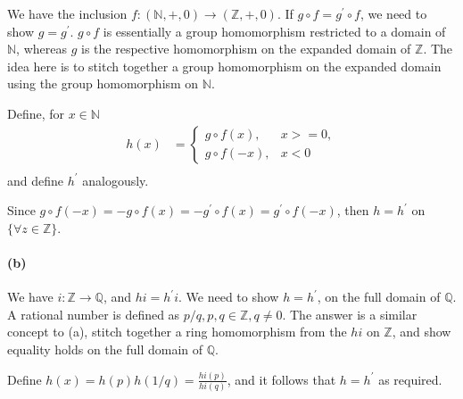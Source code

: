 \documentclass{article}
\begin{document}
We have the inclusion $f: (\mathds{N},+,0) \rightarrow (\mathds{Z},+,0)$. If $g\circ f = g^\prime\circ f$, we need to show $g=g^\prime$. $g\circ f$ is essentially a group homomorphism restricted to a domain of $\mathds{N}$, whereas $g$ is the respective homomorphism on the expanded domain of $\mathds{Z}$. The idea here is to stitch together a group homomorphism on the expanded domain using the group homomorphism on $\mathds{N}$.

Define, for $x \in \mathds{N}$
\begin{align*}
  h(x) &= \begin{cases}
    g \circ f(x), &  x >=0,  \\
    g \circ f(-x), &  x < 0
  \end{cases} \\
\end{align*} and define $h^\prime$ analogously.

Since $g \circ f(-x) = -g \circ f (x) = -g^\prime \circ f (x) = g^\prime \circ f (-x)$, then $h=h^\prime$ on $\{\forall z \in \mathds{Z}\}$.

\paragraph{(b)}
We have $i: \mathds{Z} \rightarrow \mathds{Q}$, and $hi=h^\prime i$. We need to show $h=h^
\prime$, on the full domain of $\mathds{Q}$.
A rational number is defined as $p/q, p,q \in \mathds{Z}, q \neq 0$. The answer is a similar concept to (a), stitch together a ring homomorphism from the $hi$ on $\mathds{Z}$, and show equality holds on the full domain of $\mathds{Q}$.

Define $h(x) = h(p)h(1/q) = \frac{hi(p)}{hi(q)}$, and it follows that $h=h^\prime$ as required.
\end{document}
